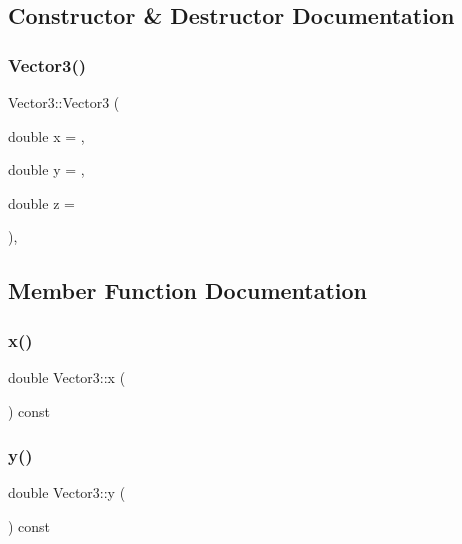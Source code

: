 \subsection{Constructor \& Destructor Documentation}
\mbox{\label{class_vector3_a6151fc844ddb2aaa316317b922cb8d22}} 
\subsubsection{\texorpdfstring{Vector3()}{Vector3()}}
{\footnotesize\ttfamily Vector3\+::\+Vector3 (\begin{DoxyParamCaption}\item[{double}]{x = {},  }\item[{double}]{y = {},  }\item[{double}]{z = {} }\end{DoxyParamCaption})\hspace{0.3cm}{\ttfamily [inline]}, {\ttfamily [explicit]}}



\subsection{Member Function Documentation}
\mbox{\label{class_vector3_a58680da7b1109919f9912cc8c5d4d54d}} 
\subsubsection{\texorpdfstring{x()}{x()}}
{\footnotesize\ttfamily double Vector3\+::x (\begin{DoxyParamCaption}{ }\end{DoxyParamCaption}) const\hspace{0.3cm}{\ttfamily [inline]}}

\mbox{\label{class_vector3_aa86961f470134f1c7ca3eec7a88ad069}} 
\subsubsection{\texorpdfstring{y()}{y()}}
{\footnotesize\ttfamily double Vector3\+::y (\begin{DoxyParamCaption}{ }\end{DoxyParamCaption}) const\hspace{0.3cm}{\ttfamily [inline]}}

